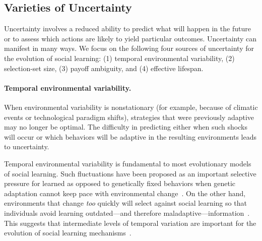 \documentclass[letterpaper,11.5pt]{scrartcl}
\begin{document}
\subsection{Varieties of Uncertainty}

Uncertainty involves a reduced ability to predict what will happen in the future or to assess which actions are likely to yield particular outcomes. Uncertainty can manifest in many ways. We focus on the following four sources of uncertainty for the evolution of social learning: (1) temporal environmental variability, (2) selection-set size, (3) payoff ambiguity, and (4) effective lifespan.

\paragraph{Temporal environmental variability.} When environmental variability is nonstationary (for example, because of climatic events %
or technological paradigm shifts), strategies that were previously adaptive may no longer be optimal. The difficulty in predicting either when such shocks will occur or which behaviors will be adaptive in the resulting environments leads to uncertainty. 

Temporal environmental variability is fundamental to most evolutionary models of
social learning. Such fluctuations have been proposed as an important selective
pressure for learned as opposed to genetically fixed behaviors when genetic adaptation cannot keep pace with environmental change~\citep{Richerson2000}. On the other hand, environments that change \emph{too} quickly will select against social learning so that individuals avoid learning outdated---and therefore maladaptive---information~\citep{Feldman1996,
BoydRicherson1985}. This suggests that intermediate levels of temporal variation
are important for the evolution of social learning mechanisms~\citep{aoki2005}.
\end{document}
